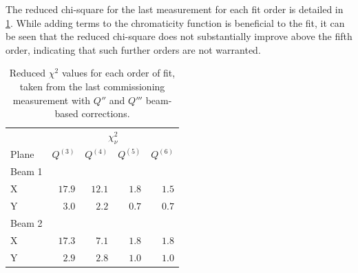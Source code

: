 The reduced chi-square for the last measurement for each fit order is detailed in
\cref{tab:high_orders:chisquare_quality}. While adding terms to the chromaticity function is
beneficial to the fit, it can be seen that the reduced chi-square does not substantially improve 
above the fifth order, indicating that such further orders are not warranted.

\begin{table}[H]
    \centering
    \begin{tabular}{lrrrr}
     \toprule
                  & \multicolumn{4}{c}{$\chi^2_\nu$} \\
        Plane     &   $Q^{(3)}$ &  $Q^{(4)}$ &   $Q^{(5)}$ &   $Q^{(6)}$  \\
      \midrule
        Beam 1    &   &   &   & \\
        \hspace{2mm}X         & $17.9$  & $12.1$ & $1.8$ & $1.5$ \\         %
        \hspace{2mm}Y         & $ 3.0$  & $2.2 $ & $0.7$ & $0.7 $\\          %
        Beam 2    &    &    &   &\\
        \hspace{2mm}X         & $17.3$ & $7.1$ & $1.8$ & $1.8$ \\           %
        \hspace{2mm}Y         & $2.9 $ & $2.8$ & $1.0$ & $1.0$ \\            %
      \bottomrule
    \end{tabular}
    \caption{Reduced $\chi^2$ values for each order of fit, taken from the last commissioning
    measurement with $Q''$ and $Q'''$ beam-based corrections.}
    \label{tab:high_orders:chisquare_quality}
  \end{table}
  



